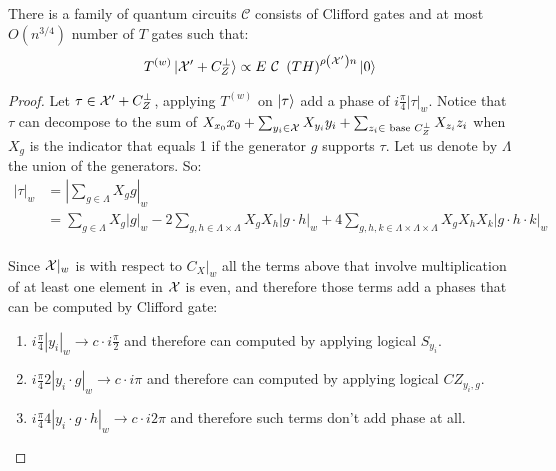 \documentclass[manuscript,screen,review]{acmart}
\begin{document}
\begin{claim}
  \label{Claim:flift}
  There is a family of quantum circuits $\mathcal{C}$ consists of Clifford gates and at most $O(n^{3/4})$ number of $T$ gates such that: 
  \begin{equation*}
    \begin{split}
      T^{(w)}\ket{\Mbas + C_{Z}^{\perp}} \propto E \ \mathcal{C} \ \left(TH\right)^{\rho\left(\sMbas\right)n} \ket{0} 
    \end{split}
  \end{equation*}
\end{claim}
\begin{proof}
  Let $\tau \in \mathcal{X}^\prime + C_{Z}^\perp$, applying $T^{(w)}$ on $\ket{\tau}$ add a phase of $i\frac{\pi}{4}\left|\tau\right|_{w}$. Notice that $\tau$ can decompose to the sum of  $X_{x_{0}}x_{0} + \sum_{y_{i} \in \mathcal{X}}{X_{y_{i}}y_{i}} + \sum_{z_{i} \in \text{ base }C_{Z}^{\perp}}{X_{z_{i}}z_{i}}$ when $X_{g}$ is the indicator that equals 1 if the generator $g$ supports $\tau$. Let us denote by $\Lambda$ the union of the generators. So:
  \begin{equation*}
    \begin{split}
      \left|\tau\right|_{w} &= \left| \sum_{g \in \Lambda}{ X_{g}g }\right|_{w} \\
      &= \sum_{g\in \Lambda}{X_{g}|g|_{w}} - 2\sum_{g,h\in \Lambda \times \Lambda}{X_{g}X_{h}|g \cdot h |_{w}}+ 4\sum_{g, h, k\in \Lambda \times \Lambda \times \Lambda }{X_{g}X_{h}X_{k}|g \cdot h \cdot k |_{w}}  \\
    \end{split}
  \end{equation*}
  
  Since $ \mathcal{X}|_{w}$ is \trig with respect to $C_{X}|_{w}$ all the terms above that involve multiplication of at least one element in $\mathcal{X}$ is even, and therefore those terms add a phases that can be computed by Clifford gate:\begin{enumerate}
    \item $i\frac{\pi}{4}|y_{i}|_{w} \rightarrow c \cdot i\frac{\pi}{2}$ and therefore can computed by applying logical $S_{y_{i}}$.
    \item $i\frac{\pi}{4}2|y_{i}\cdot g|_{w} \rightarrow c \cdot i\pi$ and therefore can computed by applying logical $CZ_{y_{i},g}$.
    \item $i\frac{\pi}{4}4|y_{i}\cdot g \cdot h |_{w} \rightarrow c \cdot i2\pi$ and therefore such terms don't add phase at all.
  \end{enumerate}


\end{proof}
\end{document}
